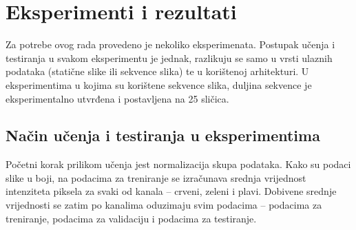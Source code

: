 \documentclass[times, utf8, diplomski, numeric]{fer}
\begin{document}
\chapter{Eksperimenti i rezultati}
Za potrebe ovog rada provedeno je nekoliko eksperimenata. 
Postupak učenja i testiranja u svakom eksperimentu je jednak, razlikuju se samo u vrsti ulaznih podataka (statične slike ili sekvence slika) te u korištenoj arhitekturi.
U eksperimentima u kojima su korištene sekvence slika, duljina sekvence je eksperimentalno utvrđena i postavljena na 25 sličica.

\section{Način učenja i testiranja u eksperimentima}
Početni korak prilikom učenja jest normalizacija skupa podataka.
Kako su podaci slike u boji, na podacima za treniranje se izračunava srednja vrijednost intenziteta piksela za svaki od kanala -- crveni, zeleni i plavi.
Dobivene srednje vrijednosti se zatim po kanalima oduzimaju svim podacima -- podacima za treniranje, podacima za validaciju i podacima za testiranje.
\end{document}
